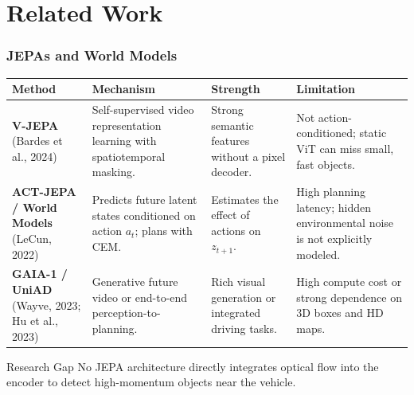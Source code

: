 \section{Related Work}

\begin{frame}
  \frametitle{JEPAs and World Models}
  \setlength{\tabcolsep}{2pt}
  \renewcommand{\arraystretch}{1.2}
  \small
  \begin{tabular}{>{\raggedright\arraybackslash}p{}|>{\raggedright\arraybackslash}p{}|>{\raggedright\arraybackslash}p{}|>{\raggedright\arraybackslash}p{}}
    \textbf{Method} & \textbf{Mechanism} & \textbf{Strength} & \textbf{Limitation} \\
    \hline
    \textbf{V-JEPA} (Bardes et al., 2024) & Self-supervised video representation learning with spatiotemporal masking. & Strong semantic features without a pixel decoder. & Not action-conditioned; static ViT can miss small, fast objects. \\
    \textbf{ACT-JEPA / World Models} (LeCun, 2022) & Predicts future latent states conditioned on action $a_t$; plans with CEM. & Estimates the effect of actions on $z_{t+1}$. & High planning latency; hidden environmental noise is not explicitly modeled. \\
    \textbf{GAIA-1 / UniAD} (Wayve, 2023; Hu et al., 2023) & Generative future video or end-to-end perception-to-planning. & Rich visual generation or integrated driving tasks. & High compute cost or strong dependence on 3D boxes and HD maps. \\
  \end{tabular}
  \vspace{0.5em}
  \begin{block}{Research Gap}
    No JEPA architecture directly integrates optical flow into the encoder to detect high-momentum objects near the vehicle.
  \end{block}
\end{frame}


